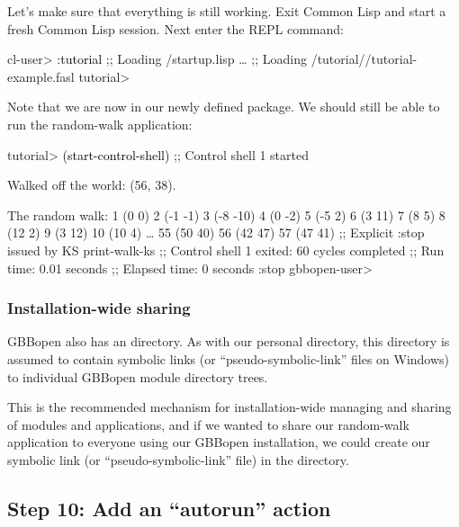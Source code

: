 \documentclass[10pt,twoside,english,pdftex]{article}
\begin{document}
Let's make sure that everything is still working.  Exit Common Lisp and start
a fresh Common Lisp session.  Next enter the
 REPL command:
%
\W\supp
\begin{smallexample}
\textcolor{darkergray}{%
  cl-user> \textcolor{black}{:tutorial}
  ;; Loading /startup.lisp
     \textrm{\ldots{}}
  ;; Loading /tutorial//tutorial-example.fasl
  tutorial>}
\end{smallexample}
%
Note that we are now in our newly defined  package.  We should
still be able to run the random-walk application:
%
\W\supp\notpretop
\begin{example}
\textcolor{darkergray}{%
  tutorial> \textcolor{black}{(start-control-shell)}
  ;; Control shell 1 started

  Walked off the world:  (56, 38).

  The random walk:
  1 (0 0)
  2 (-1 -1)
  3 (-8 -10)
  4 (0 -2)
  5 (-5 2)
  6 (3 11)
  7 (8 5)
  8 (12 2)
  9 (3 12)
  10 (10 4)
     \textrm{\ldots{}}
  55 (50 40)
  56 (42 47)
  57 (47 41)
  ;; Explicit :stop issued by KS print-walk-ks
  ;; Control shell 1 exited: 60 cycles completed
  ;; Run time: 0.01 seconds
  ;; Elapsed time: 0 seconds
  :stop
  gbbopen-user>}
\end{example}

\subsubsection*{Installation-wide sharing}
%
%

GBBopen also has an
 directory.
As with our personal  directory, this
 directory is assumed to contain symbolic
links (or ``pseudo-symbolic-link'' files on Windows) to individual GBBopen
module directory trees.

This is the recommended mechanism for installation-wide managing and sharing
of modules and applications, and if we wanted to share our random-walk
application to everyone using our GBBopen installation, we could create our
symbolic link (or ``pseudo-symbolic-link'' file) in the
 directory.

\subsection*{Step 10: Add an ``autorun'' action}
\end{document}
